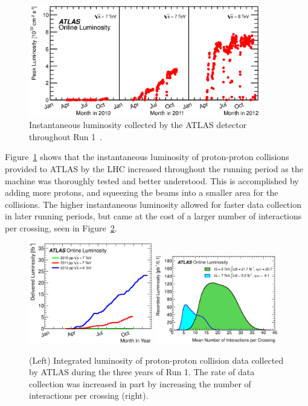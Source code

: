 \begin{figure}[th]
  \centering
  \includegraphics[width=0.9\textwidth]{figs/lhc/lumivstime.eps}
  \caption{
    Instantaneous luminosity collected by the ATLAS detector throughout
    Run 1~\cite{atlas-lumi}.
  }
  \label{fig:inst_lumi_vs_time}
\end{figure}

Figure~\ref{fig:inst_lumi_vs_time} shows that the instantaneous luminosity of
proton-proton collisions provided to ATLAS by the LHC increased throughout the
running period as the machine was thoroughly tested and better understood.
This is accomplished by adding more protons, and squeezing the beams into
a smaller area for the collisions.
The higher instantaneous luminosity allowed for faster data collection in later
running periods, but came at the cost of a larger number of interactions per
crossing, seen in Figure~\ref{fig:int_lumi_vs_time_and_pileup}.

\begin{figure}[th]
  \centering
  \includegraphics[width=0.48\textwidth]{figs/lhc/intlumivsyear.eps}
  \includegraphics[width=0.48\textwidth]{figs/lhc/mu_2011_2012-dec.eps}
  \caption{
    (Left) Integrated luminosity of proton-proton collision data collected by
    ATLAS during the three years of Run 1.
    The rate of data collection was increased in part by increasing the number
    of interactions per crossing (right).
  }
  \label{fig:int_lumi_vs_time_and_pileup}
\end{figure}


